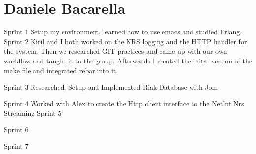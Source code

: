\section{Daniele Bacarella}

Sprint 1
Setup my environment, learned how to use emacs and studied Erlang.
Sprint 2
Kiril and I both worked on the NRS logging and the HTTP handler for the system. Then we researched GIT practices and came up with our own workflow and taught it to the group.
Afterwards I created the inital version of the make file and integrated rebar into it.

Sprint 3
Researched, Setup and Implemented Riak Database with Jon.

Sprint 4
Worked with Alex to create the Http client interface to the NetInf Nrs Streaming
Sprint 5

Sprint 6

Sprint 7
